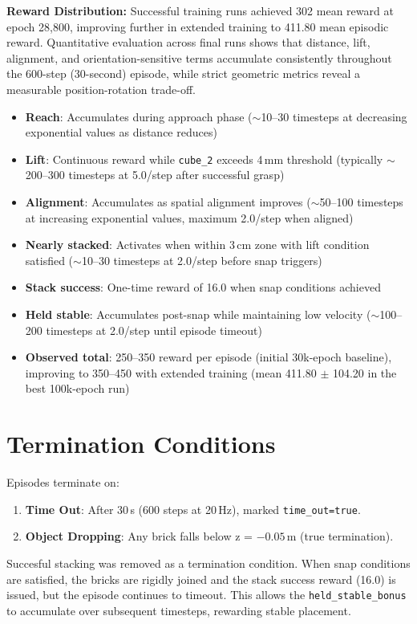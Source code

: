 \documentclass[12pt,a4paper,oneside]{report}
\begin{document}
\textbf{Reward Distribution:}
Successful training runs achieved 302 mean reward at epoch 28{,}800, improving further in extended training to 411.80 mean episodic reward. Quantitative evaluation across final runs shows that distance, lift, alignment, and orientation-sensitive terms accumulate consistently throughout the 600-step (30-second) episode, while strict geometric metrics reveal a measurable position-rotation trade-off.
\begin{itemize}
    \item \textbf{Reach}: Accumulates during approach phase ($\sim$10--30 timesteps at decreasing exponential values as distance reduces)
    \item \textbf{Lift}: Continuous reward while \texttt{cube\_2} exceeds 4\,mm threshold (typically $\sim$200--300 timesteps at 5.0/step after successful grasp)
    \item \textbf{Alignment}: Accumulates as spatial alignment improves ($\sim$50--100 timesteps at increasing exponential values, maximum 2.0/step when aligned)
    \item \textbf{Nearly stacked}: Activates when within 3\,cm zone with lift condition satisfied ($\sim$10--30 timesteps at 2.0/step before snap triggers)
    \item \textbf{Stack success}: One-time reward of 16.0 when snap conditions achieved
    \item \textbf{Held stable}: Accumulates post-snap while maintaining low velocity ($\sim$100--200 timesteps at 2.0/step until episode timeout)
    \item \textbf{Observed total}: 250--350 reward per episode (initial 30k-epoch baseline), improving to 350--450 with extended training (mean 411.80 $\pm$ 104.20 in the best 100k-epoch run)
\end{itemize}

\section{Termination Conditions}

Episodes terminate on:
\begin{enumerate}
    \item \textbf{Time Out}: After 30\,s (600 steps at 20\,Hz), marked \texttt{time\_out=true}.
    \item \textbf{Object Dropping}: Any brick falls below z = $-0.05$\,m (true termination).
\end{enumerate}

Succesful stacking was removed as a termination condition. When snap conditions are satisfied, the bricks are rigidly joined and the stack success reward (16.0) is issued, but the episode continues to timeout. This allows the \texttt{held\_stable\_bonus} to accumulate over subsequent timesteps, rewarding stable placement.
\end{document}
